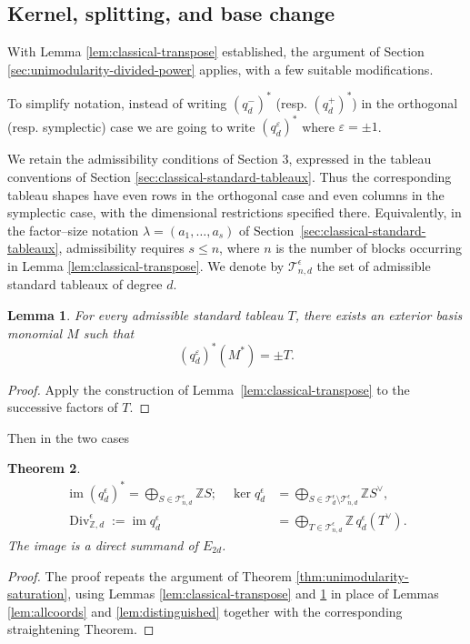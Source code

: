 \documentclass[10pt]{amsart}
\newtheorem{theorem}{Theorem}[section]
\newtheorem{lemma}[theorem]{Lemma}
\theoremstyle{definition}
\theoremstyle{remark}
\newcommand{\Div}{\operatorname{Div}}
\begin{document}
  \subsection{Kernel, splitting, and base change}

With Lemma \ref{lem:classical-transpose} established, the argument of Section \ref{sec:unimodularity-divided-power} applies, with a few suitable modifications. 
 

To simplify notation, instead of writing \((q_d^-)^*\) (resp. \((q_d^+)^*\)) in the orthogonal (resp. symplectic) case we are going to write \((q_d^{\varepsilon})^{*}\) where $\varepsilon=\pm 1$.\smallskip



We retain the admissibility conditions of Section 3,
expressed in the tableau conventions of Section \ref{sec:classical-standard-tableaux}.
Thus the corresponding tableau shapes have even rows
in the orthogonal case and even columns in the
symplectic case, with the dimensional restrictions
specified there. 
Equivalently, in the factor--size notation
$\lambda=(a_1,\ldots,a_s)$ of
Section~\ref{sec:classical-standard-tableaux},
admissibility requires $s\leq n$,
where $n$ is the
number of blocks occurring in Lemma \ref{lem:classical-transpose}.
We denote by $\mathcal T^\epsilon_{n,d}$ the set
of admissible standard tableaux of degree $d$.

\begin{lemma}\label{lem:classical-distinguished}
For every admissible standard tableau $T$, there exists an exterior
basis monomial $M$ such that
\[
(q_d^{\varepsilon})^{*}(M^{*}) = \pm T.
\]
\end{lemma}
\begin{proof}
Apply the construction of Lemma~\ref{lem:classical-transpose} to the successive factors of $T$.
\end{proof}


 
Then in the two cases

\begin{theorem}
\label{thm:classic-q-surj}\label{thm:split1}
\begin{align}
\label{eq:kernel1}
\operatorname{im}(q_d^\epsilon)^* =\bigoplus_{S\in  \mathcal T^\epsilon_{n,d}}\mathbb Z S;\quad \ker q_d^\epsilon&=\bigoplus_{S\in\mathcal T^\epsilon_{ d}\setminus \mathcal T^\epsilon_{n,d}}\mathbb Z S^\vee,\\
\label{eq:Div-basis-admissible1}
\Div^\epsilon_{\mathbb Z,d}:=\operatorname{im}q_d^\epsilon
 &=\bigoplus_{T\in\mathcal T^\epsilon_{n,d}}\mathbb Z\,q_d^\epsilon(T^\vee).
\end{align}
The image is a   direct summand of $E_{2d}$.

 
\end{theorem}
 \begin{proof}The proof repeats the argument of Theorem \ref{thm:unimodularity-saturation}, using Lemmas \ref{lem:classical-transpose} and \ref{lem:classical-distinguished} in place of Lemmas \ref{lem:allcoords} and \ref{lem:distinguished} together with the corresponding  straightening Theorem.
 \end{proof}
\end{document}
